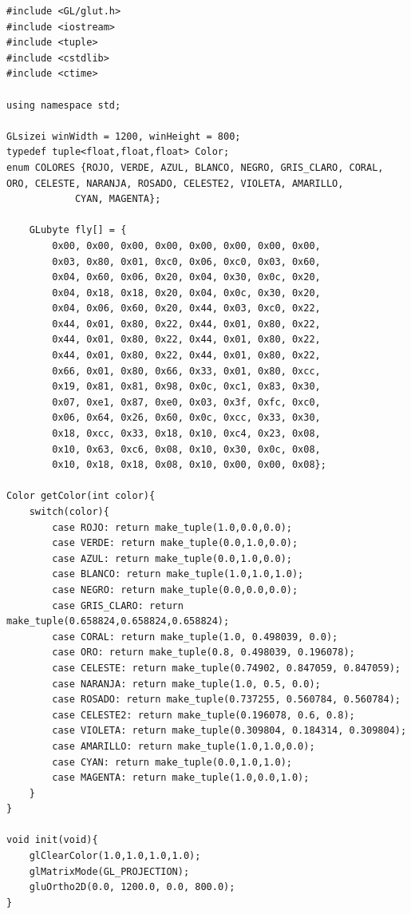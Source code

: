 \documentclass[a4paper,12pt]{article}
\begin{document}
\begin{enumerate}
\begin{lstlisting}
#include <GL/glut.h>
#include <iostream>
#include <tuple>
#include <cstdlib>
#include <ctime>

using namespace std;

GLsizei winWidth = 1200, winHeight = 800;
typedef tuple<float,float,float> Color;
enum COLORES {ROJO, VERDE, AZUL, BLANCO, NEGRO, GRIS_CLARO, CORAL, ORO, CELESTE, NARANJA, ROSADO, CELESTE2, VIOLETA, AMARILLO,
            CYAN, MAGENTA};

    GLubyte fly[] = {
        0x00, 0x00, 0x00, 0x00, 0x00, 0x00, 0x00, 0x00, 
        0x03, 0x80, 0x01, 0xc0, 0x06, 0xc0, 0x03, 0x60,
        0x04, 0x60, 0x06, 0x20, 0x04, 0x30, 0x0c, 0x20,
        0x04, 0x18, 0x18, 0x20, 0x04, 0x0c, 0x30, 0x20,
        0x04, 0x06, 0x60, 0x20, 0x44, 0x03, 0xc0, 0x22,
        0x44, 0x01, 0x80, 0x22, 0x44, 0x01, 0x80, 0x22,
        0x44, 0x01, 0x80, 0x22, 0x44, 0x01, 0x80, 0x22,
        0x44, 0x01, 0x80, 0x22, 0x44, 0x01, 0x80, 0x22,
        0x66, 0x01, 0x80, 0x66, 0x33, 0x01, 0x80, 0xcc,
        0x19, 0x81, 0x81, 0x98, 0x0c, 0xc1, 0x83, 0x30,
        0x07, 0xe1, 0x87, 0xe0, 0x03, 0x3f, 0xfc, 0xc0,
        0x06, 0x64, 0x26, 0x60, 0x0c, 0xcc, 0x33, 0x30,
        0x18, 0xcc, 0x33, 0x18, 0x10, 0xc4, 0x23, 0x08,
        0x10, 0x63, 0xc6, 0x08, 0x10, 0x30, 0x0c, 0x08,
        0x10, 0x18, 0x18, 0x08, 0x10, 0x00, 0x00, 0x08};

Color getColor(int color){
    switch(color){
        case ROJO: return make_tuple(1.0,0.0,0.0);
        case VERDE: return make_tuple(0.0,1.0,0.0);
        case AZUL: return make_tuple(0.0,1.0,0.0);
        case BLANCO: return make_tuple(1.0,1.0,1.0);
        case NEGRO: return make_tuple(0.0,0.0,0.0);
        case GRIS_CLARO: return make_tuple(0.658824,0.658824,0.658824);
        case CORAL: return make_tuple(1.0, 0.498039, 0.0);
        case ORO: return make_tuple(0.8, 0.498039, 0.196078);
        case CELESTE: return make_tuple(0.74902, 0.847059, 0.847059);
        case NARANJA: return make_tuple(1.0, 0.5, 0.0);
        case ROSADO: return make_tuple(0.737255, 0.560784, 0.560784);
        case CELESTE2: return make_tuple(0.196078, 0.6, 0.8);
        case VIOLETA: return make_tuple(0.309804, 0.184314, 0.309804);
        case AMARILLO: return make_tuple(1.0,1.0,0.0);
        case CYAN: return make_tuple(0.0,1.0,1.0);
        case MAGENTA: return make_tuple(1.0,0.0,1.0);
    }
}

void init(void){
    glClearColor(1.0,1.0,1.0,1.0);
    glMatrixMode(GL_PROJECTION);
    gluOrtho2D(0.0, 1200.0, 0.0, 800.0);
}


\end{lstlisting}
\end{enumerate}
\end{document}
